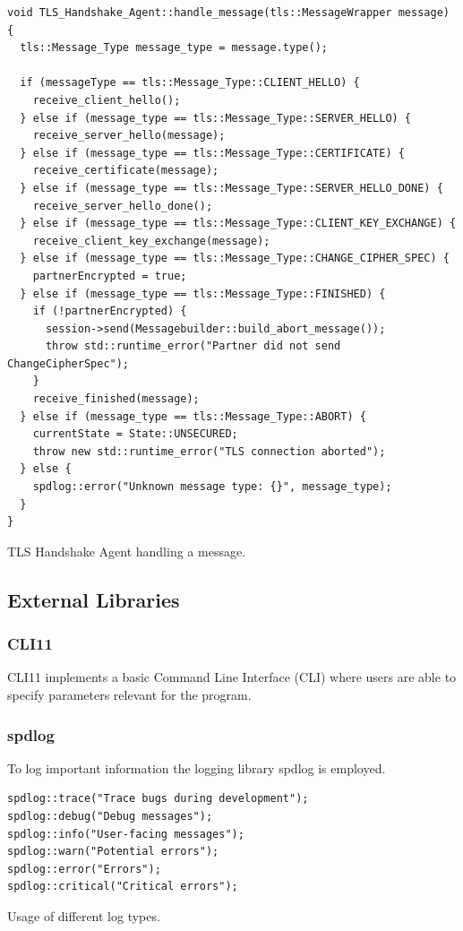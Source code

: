\documentclass[12pt, letterpaper]{article}
\newenvironment{code}{\captionsetup{type=listing}}{}
\begin{document}
\begin{code}
	\begin{verbatim}
void TLS_Handshake_Agent::handle_message(tls::MessageWrapper message) {    
  tls::Message_Type message_type = message.type();

  if (messageType == tls::Message_Type::CLIENT_HELLO) {
    receive_client_hello();
  } else if (message_type == tls::Message_Type::SERVER_HELLO) {
    receive_server_hello(message);
  } else if (message_type == tls::Message_Type::CERTIFICATE) {
    receive_certificate(message);
  } else if (message_type == tls::Message_Type::SERVER_HELLO_DONE) {
    receive_server_hello_done();
  } else if (message_type == tls::Message_Type::CLIENT_KEY_EXCHANGE) {
    receive_client_key_exchange(message);
  } else if (message_type == tls::Message_Type::CHANGE_CIPHER_SPEC) {
    partnerEncrypted = true;
  } else if (message_type == tls::Message_Type::FINISHED) {
    if (!partnerEncrypted) {
      session->send(Messagebuilder::build_abort_message());
      throw std::runtime_error("Partner did not send ChangeCipherSpec");
    }
    receive_finished(message);
  } else if (message_type == tls::Message_Type::ABORT) {
    currentState = State::UNSECURED;
    throw new std::runtime_error("TLS connection aborted");
  } else {
    spdlog::error("Unknown message type: {}", message_type);
  }
}
	\end{verbatim}
	\caption{TLS Handshake Agent handling a message.}
	\label{messageHandling}
\end{code}

\pagebreak

\subsection{External Libraries}
\label{extBib}

\subsubsection{CLI11}
CLI11 \cite{cli11_ref} implements a basic Command Line Interface (CLI) where users are able to specify parameters relevant for the program. 


\subsubsection{spdlog}
To log important information the logging library spdlog \cite{spdlog_ref} is employed.

\begin{code}
	\begin{verbatim}
spdlog::trace("Trace bugs during development");
spdlog::debug("Debug messages");
spdlog::info("User-facing messages");
spdlog::warn("Potential errors");
spdlog::error("Errors");
spdlog::critical("Critical errors");
	\end{verbatim}
	\caption{Usage of different log types.}
	\label{spdlog}
\end{code}
\end{document}
